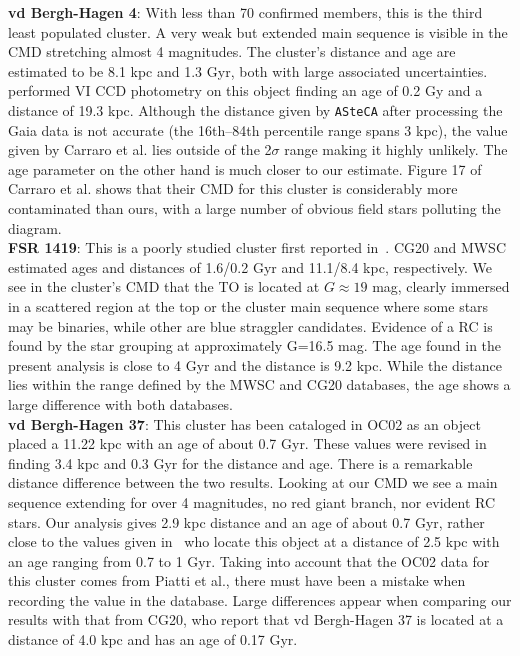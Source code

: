 \documentclass{aa}
\begin{document}
\begin{appendix}
  \noindent \textbf{vd Bergh-Hagen 4}: With less than 70 confirmed members, this is the
  third least populated cluster. A very weak but extended main sequence is
  visible in the CMD stretching almost 4 magnitudes.
  The cluster's distance and age are estimated to be 8.1 kpc and 1.3 Gyr,
  both with large associated uncertainties.
  \cite{Carraro_2007} performed VI CCD photometry on this object finding an
  age of 0.2 Gy and a distance of 19.3 kpc. Although the distance given by
  \texttt{ASteCA} after processing the Gaia data is not accurate (the 16th--84th
  percentile range spans 3 kpc), the value given by Carraro et al. lies outside
  of the 2$\sigma$ range making it highly unlikely. The age parameter on the other
  hand is much closer to our estimate.
   Figure 17 of Carraro et al. shows  that their CMD for this
  cluster is considerably more contaminated than ours, with a large number of
  obvious field stars polluting the diagram.\\

  \noindent \textbf{FSR 1419}: This is a poorly studied cluster first reported
  in~\cite{Froebrich_2007}. CG20 and MWSC estimated ages and distances of
  1.6/0.2 Gyr and 11.1/8.4 kpc, respectively.
  We see in the cluster's  CMD that the TO is located at $G\approx19$ mag,
  clearly immersed in a scattered region at the top or the cluster main sequence
  where some stars may be binaries, while other are blue straggler candidates.
  Evidence of a RC is found by the star grouping at approximately G=16.5 mag.
  The age found in the present analysis is close to 4 Gyr and the distance is
  9.2 kpc. While the distance lies within the range defined by the MWSC and CG20
  databases, the age shows a large difference with both databases.\\  

  \noindent \textbf{vd Bergh-Hagen 37}: This cluster has been cataloged in OC02
  as an object placed a 11.22 kpc with an age of about 0.7 Gyr. These values were
  revised in~\cite{Dias_2021} finding 3.4 kpc and 0.3 Gyr for the distance and
  age. There is a remarkable distance difference between the two results. 
  Looking at our CMD we see a main sequence extending for over 4 magnitudes, no
  red giant branch, nor evident RC stars. Our analysis gives 2.9 kpc distance and
  an age of about 0.7 Gyr, rather close to the values given
  in~\cite{Piatti_2010} who locate this object at a distance of 2.5 kpc with an
  age ranging from 0.7 to 1 Gyr. Taking into account that the OC02 data for this
  cluster comes from Piatti et al., there must have been a mistake when recording
  the value in the database.
  Large differences appear when comparing our results with that from CG20, who
  report that vd Bergh-Hagen 37 is located at a distance of 4.0 kpc and has  an age
  of 0.17 Gyr.\\


\end{appendix}
\end{document}
